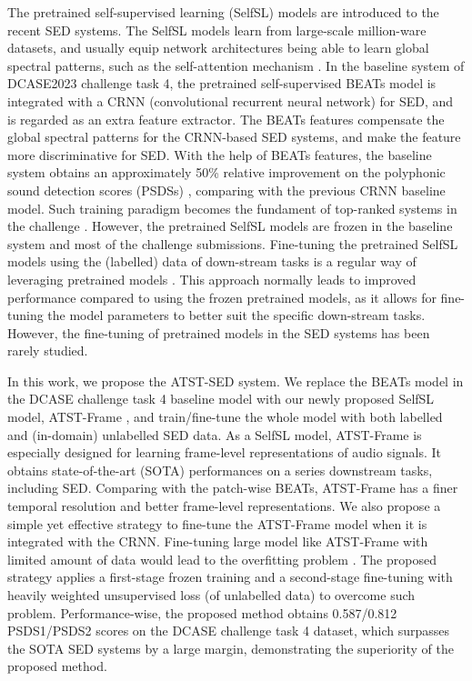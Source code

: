 \documentclass{article}
\begin{document}
The pretrained self-supervised learning (SelfSL) models are introduced to the recent SED systems. The SelfSL models learn from large-scale million-ware datasets, and usually equip network architectures being able to learn global spectral patterns, such as the self-attention mechanism \cite{vaswani2017attention}. In the baseline system of DCASE2023 challenge task 4, the pretrained self-supervised BEATs model \cite{Chen2023BEATs} is integrated with a CRNN (convolutional recurrent neural network) for SED, and is regarded as an extra feature extractor. The BEATs features compensate the global spectral patterns for the CRNN-based SED systems, and make the feature more discriminative for SED. With the help of BEATs features, the baseline system obtains an approximately 50\% relative improvement on the polyphonic sound detection scores (PSDSs) \cite{ebbers2022psds}, comparing with the previous CRNN baseline model. Such training paradigm becomes the fundament of top-ranked systems in the challenge \cite{Zhang2023MFD, Kim2023FDYLKA}.
However, the pretrained SelfSL models are frozen in the baseline system and most of the challenge submissions. 
Fine-tuning the pretrained SelfSL models using the (labelled) data of down-stream tasks is a regular way of leveraging pretrained models \cite{li2022atst, Chen2023BEATs, li2023self}. 
This approach normally leads to improved performance compared to using the frozen pretrained models, as it allows for fine-tuning the model parameters to better suit the specific down-stream tasks.
However, the fine-tuning of pretrained models in the SED systems has been rarely studied.


In this work, we propose the ATST-SED system. We replace the BEATs model in the DCASE challenge task 4 baseline model with our newly proposed SelfSL model, ATST-Frame \cite{li2023self}, and train/fine-tune the whole model with both labelled and (in-domain) unlabelled SED data. As a SelfSL model, ATST-Frame is especially designed for learning frame-level representations of audio signals. It obtains state-of-the-art (SOTA) performances on a series downstream tasks, including SED. Comparing with the patch-wise BEATs, ATST-Frame has a finer temporal resolution and better frame-level representations. We also propose a simple yet effective strategy to fine-tune the ATST-Frame model when it is integrated with the CRNN. Fine-tuning large model like ATST-Frame with limited amount of data would lead to the overfitting problem \cite{li2023self}. The proposed strategy applies a first-stage frozen training and a second-stage fine-tuning with heavily weighted unsupervised loss (of unlabelled data) to overcome such problem. Performance-wise, the proposed method obtains 0.587/0.812 PSDS1/PSDS2 scores on the DCASE challenge task 4 dataset, which surpasses the SOTA SED systems by a large margin, demonstrating the superiority of the proposed method.
\end{document}
